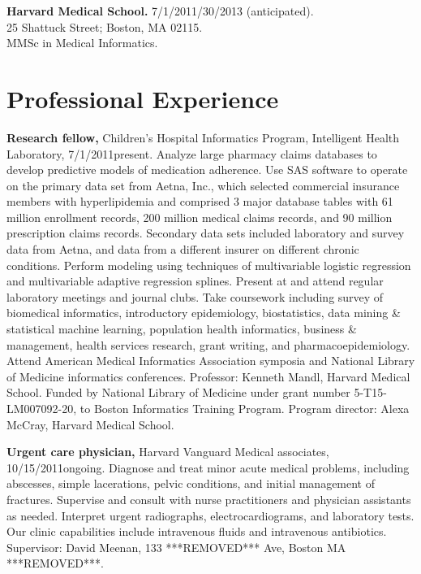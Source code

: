 \documentclass[12pt]{article}
\begin{document}
\textbf{Harvard Medical School.} 7/1/2011/30/2013 (anticipated).\\
25 Shattuck Street; Boston, MA 02115.\\
MMSc in Medical Informatics.

\section{Professional Experience}

\textbf{Research fellow,} Children’s Hospital Informatics Program,
Intelligent Health Laboratory, 7/1/2011\ndash{}\linebreak[3]pres\-ent.
Analyze large pharmacy claims databases to develop predictive models
of medication adherence. Use SAS software to operate on the primary
data set from Aetna, Inc., which selected commercial insurance members
with hyperlipidemia and comprised 3 major database tables with 61
million enrollment records, 200 million medical claims records, and 90
million prescription claims records. Secondary data sets included
laboratory and survey data from Aetna, and data from a different
insurer on different chronic conditions. Perform modeling using
techniques of multivariable logistic regression and multivariable
adaptive regression splines. Present at and attend regular laboratory
meetings and journal clubs. Take coursework including survey of
biomedical informatics, introductory epidemiology, biostatistics, data
mining \& statistical machine learning, population health informatics,
business \& management, health services research, grant writing, and
pharmacoepidemiology. Attend American Medical Informatics Association
symposia and National Library of Medicine informatics conferences.
Professor: Kenneth Mandl, Harvard Medical School. Funded by National
Library of Medicine under grant number 5-T15-LM007092-20, to Boston
Informatics Training Program. Program director: Alexa McCray, Harvard
Medical School.

\textbf{Urgent care physician,} Harvard Vanguard Medical associates,
10/15/2011\ndash{}ongoing. Diagnose and treat minor acute medical problems,
including abscesses, simple lacerations, pelvic conditions, and
initial management of fractures. Supervise and consult with nurse
practitioners and physician assistants as needed. Interpret urgent
radiographs, electrocardiograms, and laboratory tests. Our clinic
capabilities include intravenous fluids and intravenous antibiotics.
Supervisor: David Meenan, 133 ***REMOVED*** Ave, Boston MA ***REMOVED***.
\end{document}
